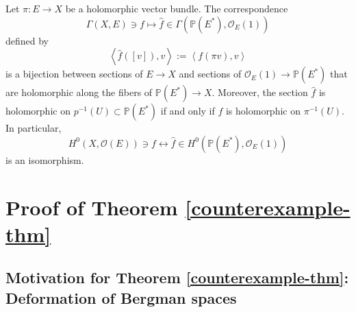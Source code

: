 \documentclass[12pt,hidelinks]{amsart}
\newcommand{\cO}{{\mathcal O}}
\newcommand{\bbP}{{\mathbb P}}
\begin{document}
\begin{prop}\label{section-id-prop}
Let $\pi :E \to X$ be a holomorphic vector bundle.  The correspondence 
\[
\Gamma (X, E) \ni f \mapsto \hat f \in \Gamma (\bbP(E^*), \cO _E(1))
\]
defined by 
\[
\left < \hat f ([v]), v \right > := \left < f( \pi v), v \right >
\]
is a bijection between sections of $E \to X$ and sections of $\cO _E(1) \to \bbP(E^*)$ that are holomorphic along the fibers of $\bbP(E^*) \to X$.  Moreover, the section $\hat f$ is holomorphic on $p ^{-1} (U) \subset \bbP(E^*)$ if and only if $f$ is holomorphic on $\pi ^{-1} (U)$.  In particular, 
\[
H^0(X, \cO (E)) \ni f \longleftrightarrow \hat f \in H^0(\bbP(E^*), \cO _E (1))
\]
is an isomorphism.
\end{prop}


\section{Proof of Theorem \ref{counterexample-thm}}\label{examples-section}

\subsection{Motivation for Theorem \ref{counterexample-thm}:  Deformation of Bergman spaces}
\end{document}
